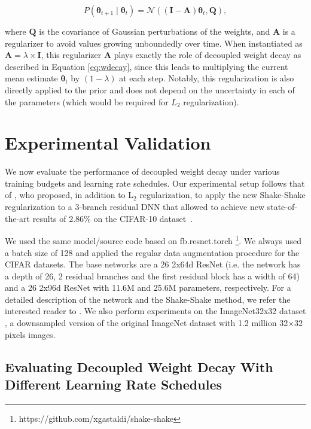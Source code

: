 \begin{equation}
\label{eq:aitchison}P(\bm{\theta}_{t+1} \mid \bm{\theta}_t) = \mathcal{N}((\bm{I}-\bm{A}) \bm{\theta}_t, \bm{Q}),
\end{equation}

where $\bm{Q}$ is the covariance of Gaussian perturbations of the weights, and $\bm{A}$ is a regularizer to avoid values growing unboundedly over time. When instantiated as $\bm{A} = \lambda\times \bm{I}$, this regularizer $\bm{A}$ plays exactly the role of decoupled weight decay as described in Equation \ref{eq:wdecay}, since this leads to multiplying the current mean estimate $\bm{\theta}_t$ by $(1-\lambda)$ at each step. Notably, this regularization is also directly applied to the prior and does not depend on the uncertainty in each of the parameters (which would be required for $L_2$ regularization).

\section{Experimental Validation}

We now evaluate the performance of decoupled weight decay under various training budgets and learning rate schedules. Our experimental setup follows that of \citet{gastaldi2017shake}, who proposed, in addition to L$_2$ regularization, to apply the new Shake-Shake regularization to a 3-branch residual DNN that allowed to achieve new state-of-the-art results of 2.86\% on the CIFAR-10 dataset~\citep{krizhevsky2009learning}.

We used the same model/source code based on fb.resnet.torch \footnote{https://github.com/xgastaldi/shake-shake}. 
We always used a batch size of 128 and applied the regular data augmentation procedure for the CIFAR datasets. The base networks are a 26 2x64d ResNet (i.e. the network has a depth of 26, 2 residual branches and the first residual block has a width of 64) and a 26 2x96d ResNet with 11.6M and 25.6M parameters, respectively. For a detailed description of the network and the Shake-Shake method, we refer the interested reader to \citet{gastaldi2017shake}. We also perform experiments on the ImageNet32x32 dataset \citep{chrabaszcz2017downsampled}, a downsampled version of the original ImageNet dataset with 1.2 million  32$\times$32 pixels images. 

\subsection{Evaluating Decoupled Weight Decay With Different Learning Rate Schedules}

